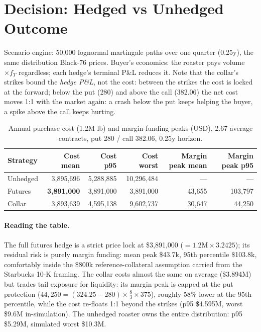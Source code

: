 \documentclass[11pt,a4paper]{article}
\newcommand{\usd}{\$}
\begin{document}
\section{Decision: Hedged vs Unhedged Outcome}

Scenario engine: 50,000 lognormal martingale paths over one quarter
(0.25y), the same distribution Black-76 prices. Buyer's economics: the
roaster pays volume $\times f_T$ regardless; each hedge's terminal P\&L
reduces it. Note that the collar's strikes bound the \emph{hedge P\&L},
not the cost: between the strikes the cost is locked at the forward;
below the put (280) and above the call (382.06) the net cost moves 1:1
with the market again: a crash below the put keeps helping the buyer,
a spike above the call keeps hurting.

\begin{table}[h!]
\centering\small
\begin{tabular}{lrrrrr}
\toprule
\textbf{Strategy} & \textbf{Cost mean} & \textbf{Cost p95} & \textbf{Cost worst} &
\textbf{Margin peak mean} & \textbf{Margin peak p95} \\
\midrule
Unhedged & 3,895,696 & 5,288,885 & 10,296,484 & --- & --- \\
Futures & \textbf{3,891,000} & 3,891,000 & 3,891,000 & 43,655 & 103,797 \\
Collar & 3,893,639 & 4,595,138 & 9,602,737 & 30,647 & 44,250 \\
\bottomrule
\end{tabular}
\caption{Annual purchase cost (1.2M lb) and margin-funding peaks (USD),
2.67 average contracts, put 280 / call 382.06, 0.25y horizon.}
\end{table}

\paragraph{Reading the table.} The full futures hedge is a strict price
lock at \usd{}3,891,000 ($= 1.2\mathrm{M}\times 3.2425$); its residual
risk is purely margin funding: mean peak \usd{}43.7k, 95th percentile
\usd{}103.8k, comfortably inside the \usd{}800k reference-collateral
assumption carried from the Starbucks 10-K framing. The collar costs
almost the same on average (\usd{}3.894M) but trades tail exposure for
liquidity: its margin peak is capped at the put protection
($44{,}250 = (324.25 - 280)\times \tfrac{8}{3}\times 375$), roughly 58\% lower
at the 95th percentile, while the cost re-floats 1:1 beyond the strikes
(p95 \usd{}4.595M, worst \usd{}9.6M in-simulation). The unhedged roaster
owns the entire distribution: p95 \usd{}5.29M, simulated worst \usd{}10.3M.
\end{document}

